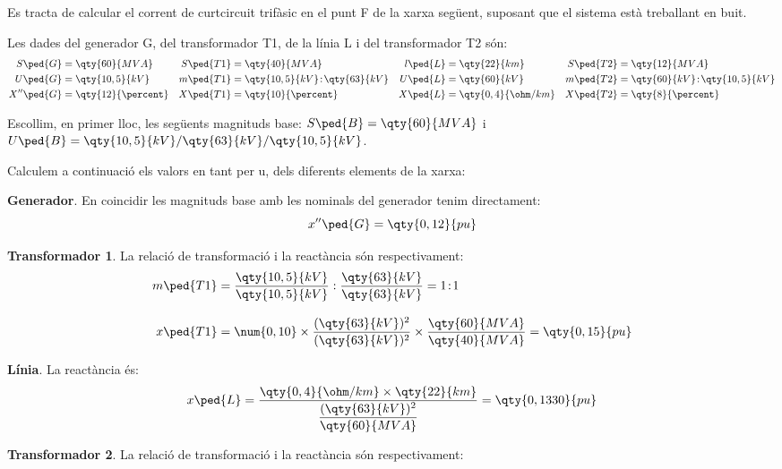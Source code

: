\begin{exemple}[\MetodeCalculPU{}]\label{ex:MetodeCalculPU}
	\addcontentsxms{\MetodeCalculPU}
    Es tracta de calcular el corrent de curtcircuit trifàsic en el punt F de la xarxa següent, suposant
    que el sistema està treballant en buit.
    \begin{center}
        
    \end{center}

    Les dades del generador G, del transformador T1, de la línia L i del transformador T2 són:
    \begin{align*}
       S\ped{G} &= \qty{60}{MVA} & S\ped{T1} &= \qty{40}{MVA} & l\ped{L} &= \qty{22}{km} & S\ped{T2} &=
       \qty{12}{MVA} \\
       U\ped{G} &= \qty{10,5}{kV} & m\ped{T1} &= \qty{10,5}{kV}\!:\!\qty{63}{kV} & U\ped{L} &= \qty{60}{kV} & m\ped{T2} &= \qty{60}{kV}\!:\!\qty{10,5}{kV} \\
       X''\ped{G} &= \qty{12}{\percent} & X\ped{T1} &= \qty{10}{\percent} & X\ped{L} &= \qty{0,4}{\ohm/km} & X\ped{T2} &= \qty{8}{\percent}
    \end{align*}

    Escollim, en primer lloc, les següents magnituds base: $S\ped{B} = \qty{60}{MVA}$ i $U\ped{B}
    = \qty{10,5}{kV} / \qty{63}{kV} / \qty{10,5}{kV}$.

    Calculem a continuació els valors en tant per u, dels diferents elements de la xarxa:

    \textbf{Generador}. En coincidir les magnituds base amb les nominals del generador tenim
     directament:
    \[
    x''\ped{G} = \qty{0,12}{pu}
    \]

    \textbf{Transformador 1}. La relació de transformació i la reactància són respectivament:
    \begin{align*}
    m\ped{T1} &= \frac{\qty{10,5}{kV}}{\qty{10,5}{kV}} :
    \frac{\qty{63}{kV}}{\qty{63}{kV}} = 1\!:\!1 \\[3mm]
    x\ped{T1} &= \num{0,10} \times \frac{(\qty{63}{kV})^2}{(\qty{63}{kV})^2} \times
    \frac{\qty{60}{MVA}}{\qty{40}{MVA}}  = \qty{0,15}{pu}
    \end{align*}

    \textbf{Línia}. La reactància és:
    \[
    x\ped{L} = \frac{\qty{0,4}{\ohm/km} \times \qty{22}{km}} {\dfrac{(\qty{63}{kV})^2}{\qty{60}{MVA}}}  =
    \qty{0,1330}{pu}
    \]

    \textbf{Transformador 2}. La relació de transformació i la reactància són respectivament:


\end{exemple}
